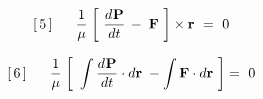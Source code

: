 \documentclass[10pt,fleqn]{article}
\begin{document}
\par \vspace{+0.15em}
\begin{eqnarray*}
\hspace{+1.26em} [\,5\,] \;\;\;\;\;\; \dfrac{1}{\mu} \; \bigg [ \,\, \dfrac{d\hspace{+0.045em}\mathbf{P}}{dt} \, - \; \mathbf{F} \,\, \bigg ] \times \mathbf{r} ~=~ 0
\end{eqnarray*}
\par \vspace{+0.15em}
\begin{eqnarray*}
\hspace{+1.26em} [\,6\,] \;\;\;\;\;\; \dfrac{1}{\mu} \; \bigg [ \,\, \int \dfrac{d\hspace{+0.045em}\mathbf{P}}{dt} \cdot d\mathbf{r} \; - \int \mathbf{F} \cdot d\mathbf{r} \,\, \bigg ] =~ 0
\end{eqnarray*}
\end{document}
